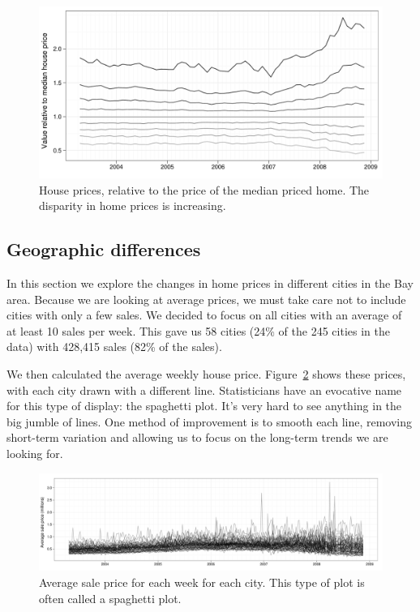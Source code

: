 \documentclass[oneside]{article}
\begin{document}
\begin{figure}[htbp]
  \centering
  \includegraphics[width=0.75\linewidth]{decile-rel}
  \caption{House prices, relative to the price of the median priced home.  The disparity in home prices is increasing.}
  \label{fig:decile-rel}
\end{figure}

\subsection{Geographic differences}

In this section we explore the changes in home prices in different cities in the Bay area.  Because we are looking at average prices, we must take care not to include cities with only a few sales. We decided to focus on all cities with an average of at least 10 sales per week. This gave us 58 cities (24\% of the 245 cities in the data) with 428,415 sales (82\% of the sales).  

We then calculated the average weekly house price. Figure~\ref{fig:spaghetti} shows these prices, with each city drawn with a different line.  Statisticians have an evocative name for this type of display: the spaghetti plot.  It's very hard to see anything in the big jumble of lines.  One method of improvement is to smooth each line, removing short-term variation and allowing us to focus on the long-term trends we are looking for.

\begin{figure}[htbp]
  \centering
    \includegraphics[width=0.9\linewidth]{cities-price}
  \caption{Average sale price for each week for each city.  This type of plot is often called a spaghetti plot.}
  \label{fig:spaghetti}
\end{figure}
\end{document}
